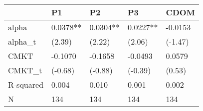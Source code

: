 \begin{tabular}{lllll}
\toprule
 & P1 & P2 & P3 & CDOM \\
\midrule
alpha & 0.0378** & 0.0304** & 0.0227** & -0.0153 \\
alpha_t & (2.39) & (2.22) & (2.06) & (-1.47) \\
CMKT & -0.1070 & -0.1658 & -0.0493 & 0.0579 \\
CMKT_t & (-0.68) & (-0.88) & (-0.39) & (0.53) \\
R-squared & 0.004 & 0.010 & 0.001 & 0.002 \\
N & 134 & 134 & 134 & 134 \\
\bottomrule
\end{tabular}
